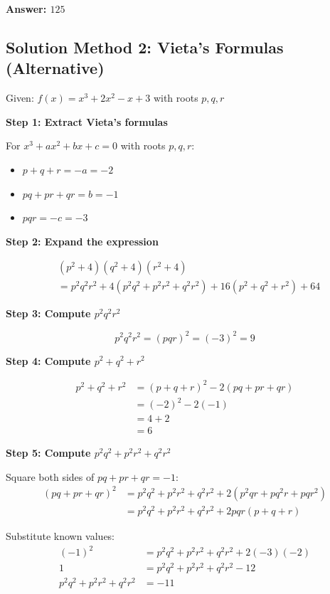 \documentclass[12pt]{article}
\begin{document}
\textbf{Answer: $\boxed{125}$}

\subsection*{Solution Method 2: Vieta's Formulas (Alternative)}

Given: $f(x) = x^3 + 2x^2 - x + 3$ with roots $p, q, r$

\textbf{Step 1: Extract Vieta's formulas}

For $x^3 + ax^2 + bx + c = 0$ with roots $p, q, r$:
\begin{itemize}
    \item $p + q + r = -a = -2$
    \item $pq + pr + qr = b = -1$
    \item $pqr = -c = -3$
\end{itemize}

\textbf{Step 2: Expand the expression}

\begin{align*}
&(p^2 + 4)(q^2 + 4)(r^2 + 4)\\
&= p^2q^2r^2 + 4(p^2q^2 + p^2r^2 + q^2r^2) + 16(p^2 + q^2 + r^2) + 64
\end{align*}

\textbf{Step 3: Compute $p^2q^2r^2$}

\[p^2q^2r^2 = (pqr)^2 = (-3)^2 = 9\]

\textbf{Step 4: Compute $p^2 + q^2 + r^2$}

\begin{align*}
p^2 + q^2 + r^2 &= (p + q + r)^2 - 2(pq + pr + qr)\\
&= (-2)^2 - 2(-1)\\
&= 4 + 2\\
&= 6
\end{align*}

\textbf{Step 5: Compute $p^2q^2 + p^2r^2 + q^2r^2$}

Square both sides of $pq + pr + qr = -1$:
\begin{align*}
(pq + pr + qr)^2 &= p^2q^2 + p^2r^2 + q^2r^2 + 2(p^2qr + pq^2r + pqr^2)\\
&= p^2q^2 + p^2r^2 + q^2r^2 + 2pqr(p + q + r)
\end{align*}

Substitute known values:
\begin{align*}
(-1)^2 &= p^2q^2 + p^2r^2 + q^2r^2 + 2(-3)(-2)\\
1 &= p^2q^2 + p^2r^2 + q^2r^2 - 12\\
p^2q^2 + p^2r^2 + q^2r^2 &= -11
\end{align*}
\end{document}
